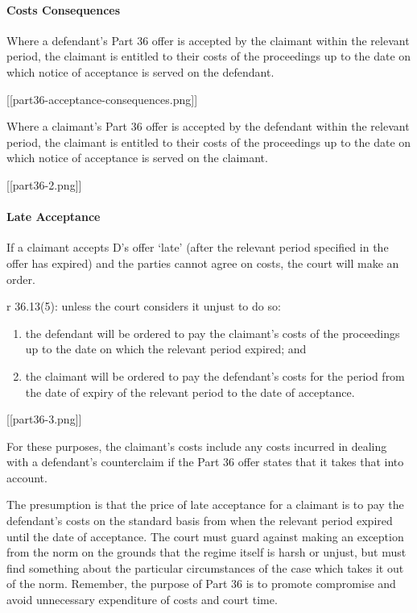 \documentclass[
]{article}
\providecommand{\tightlist}{%
  \setlength{\itemsep}{0pt}\setlength{\parskip}{0pt}}
\begin{document}
\hypertarget{costs-consequences}{%
\paragraph{Costs Consequences}\label{costs-consequences}}

Where a defendant's Part 36 offer is accepted by the claimant within the
relevant period, the claimant is entitled to their costs of the
proceedings up to the date on which notice of acceptance is served on
the defendant.

{[}{[}part36-acceptance-consequences.png{]}{]}

Where a claimant's Part 36 offer is accepted by the defendant within the
relevant period, the claimant is entitled to their costs of the
proceedings up to the date on which notice of acceptance is served on
the claimant.

{[}{[}part36-2.png{]}{]}

\hypertarget{late-acceptance}{%
\paragraph{Late Acceptance}\label{late-acceptance}}

If a claimant accepts D's offer `late' (after the relevant period
specified in the offer has expired) and the parties cannot agree on
costs, the court will make an order.

r 36.13(5): unless the court considers it unjust to do so:

\begin{enumerate}
\def\labelenumi{\arabic{enumi}.}
\tightlist
\item
  the defendant will be ordered to pay the claimant's costs of the
  proceedings up to the date on which the relevant period expired; and
\item
  the claimant will be ordered to pay the defendant's costs for the
  period from the date of expiry of the relevant period to the date of
  acceptance.
\end{enumerate}

{[}{[}part36-3.png{]}{]}

For these purposes, the claimant's costs include any costs incurred in
dealing with a defendant's counterclaim if the Part 36 offer states that
it takes that into account.

The presumption is that the price of late acceptance for a claimant is
to pay the defendant's costs on the standard basis from when the
relevant period expired until the date of acceptance. The court must
guard against making an exception from the norm on the grounds that the
regime itself is harsh or unjust, but must find something about the
particular circumstances of the case which takes it out of the norm.
Remember, the purpose of Part 36 is to promote compromise and avoid
unnecessary expenditure of costs and court time.
\end{document}
